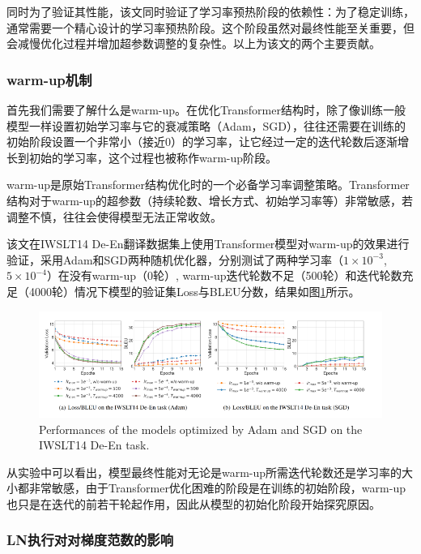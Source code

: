 同时为了验证其性能，该文同时验证了学习率预热阶段的依赖性：为了稳定训练，通常需要一个精心设计的学习率预热阶段。这个阶段虽然对最终性能至关重要，但会减慢优化过程并增加超参数调整的复杂性。以上为该文的两个主要贡献。

\subsubsection{warm-up机制}

首先我们需要了解什么是warm-up。在优化Transformer结构时，除了像训练一般模型一样设置初始学习率与它的衰减策略（Adam，SGD），往往还需要在训练的初始阶段设置一个非常小（接近0）的学习率，让它经过一定的迭代轮数后逐渐增长到初始的学习率，这个过程也被称作warm-up阶段。

warm-up是原始Transformer结构优化时的一个必备学习率调整策略。Transformer结构对于warm-up的超参数（持续轮数、增长方式、初始学习率等）非常敏感，若调整不慎，往往会使得模型无法正常收敛。

该文在IWSLT14 De-En翻译数据集上使用Transformer模型对warm-up的效果进行验证，采用Adam和SGD两种随机优化器，分别测试了两种学习率（$1 \times 10^{-3}$, $5 \times 10^{-4}$）在没有warm-up（0轮）, warm-up迭代轮数不足（500轮）和迭代轮数充足（4000轮）情况下模型的验证集Loss与BLEU分数，结果如图\ref{fig:performance}所示。

\begin{figure}[ht]
    \centering
    \includegraphics[width=\textwidth]{img/LN/LN-2.jpg}
    \caption{Performances of the models optimized by Adam and SGD on the IWSLT14 De-En task.}
    \label{fig:performance}
\end{figure}

从实验中可以看出，模型最终性能对无论是warm-up所需迭代轮数还是学习率的大小都非常敏感，由于Transformer优化困难的阶段是在训练的初始阶段，warm-up也只是在迭代的前若干轮起作用，因此从模型的初始化阶段开始探究原因。

\subsubsection{LN执行对对梯度范数的影响}


